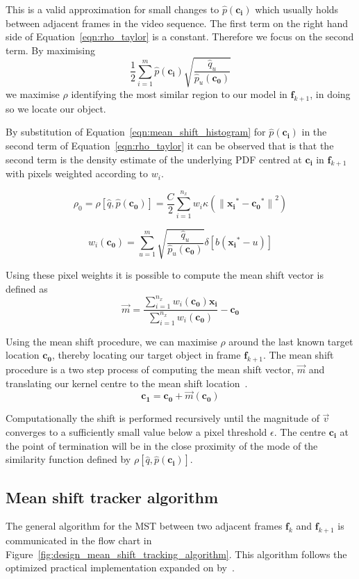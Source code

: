 This is a valid approximation for small changes to $\hat{p}(\mathbf{c_i})$
which usually holds between adjacent frames in the video sequence. 
The first term on the right hand side of Equation~\ref{eqn:rho_taylor} is a
constant. Therefore we focus on the second term.
By maximising 
\[\frac{1}{2}\sum_{i=1}^{m}\hat{p}(\mathbf{c_i})\sqrt{\frac{\hat{q}_u}{\hat{p}_u(\mathbf{c_0})}}\]
we maximise $\rho$ identifying the most similar region to our model in
$\mathbf{f}_{k+1}$, in doing so we locate our object.

By substitution of Equation~\ref{eqn:mean_shift_histogram} for $\hat{p}(\mathbf{c_i})$ in
the second term of Equation~\ref{eqn:rho_taylor} it can be observed that is that the
second term is the density estimate of the underlying PDF centred at
$\mathbf{c_i}$ in $\mathbf{f}_{k+1}$ with pixels weighted according to $w_i$.

\[\rho_0=\rho[\hat{q}, \hat{p}(\mathbf{c_0})]=\frac{C}{2}\sum_{i=1}^{n_x}w_i\kappa({\parallel{\mathbf{x_i}^*}-{\mathbf{c_0}^*}\parallel}^2)\]

\begin{equation}\label{eqn:mean_shift_weights}
    w_i(\mathbf{c_0})=\sum_{u=1}^{m}\sqrt{\frac{\hat{q}_u}{\hat{p}_u(\mathbf{c_0})}} \delta[b(\mathbf{x_i}^*-u)]
\end{equation}

Using these pixel weights it is possible to compute the mean shift vector is defined as
\begin{equation}\label{eqn:mean_shift_vector}
    \vec{m} = \frac{\sum_{i=1}^{n_x}w_i(\mathbf{c_0})\mathbf{x_i}}{\sum_{i=1}^{n_x}w_i(\mathbf{c_0})}-\mathbf{c_0}
\end{equation}

Using the mean shift procedure, we can maximise $\rho$ around the
last known target location $\mathbf{c_0}$, thereby locating our target object in frame $\mathbf{f}_{k+1}$. 
The mean shift procedure is a two step process of computing the mean shift
vector, $\vec{m}$ and translating our kernel centre to the mean shift location~\cite{Comaniciu2002}. 
\[\mathbf{c_1} = \mathbf{c_0} + \vec{m}(\mathbf{c_0})\]

Computationally the shift is performed recursively until the magnitude of $\vec{v}$ converges
to a sufficiently small value below a pixel threshold $\epsilon$. The centre
$\mathbf{c_i}$ at the point of termination will be in the close proximity of the
mode of the similarity function defined by $\rho[\hat{q},\hat{p}(\mathbf{c_i})]$.

\subsection{Mean shift tracker algorithm}\label{theoretical_framework_mean_shift_algorithm}
The general algorithm for the MST between two adjacent frames $\mathbf{f}_k$ and
$\mathbf{f}_{k+1}$ is communicated in the flow chart in
Figure~\ref{fig:design_mean_shift_tracking_algorithm}. This algorithm follows
the optimized practical implementation expanded on by~\cite{Comaniciu2003}. 

